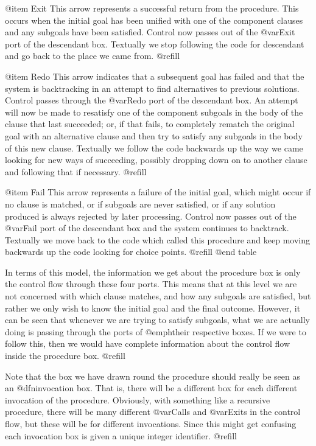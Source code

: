 @item Exit
This arrow represents a successful return from the procedure.  This
occurs when the initial goal has been unified with one of the component
clauses and any subgoals have been satisfied.  Control now passes out of
the @var{Exit} port of the descendant box.  Textually we stop following
the code for descendant and go back to the place we came from. @refill

@item Redo
This arrow indicates that a subsequent goal has failed and that the system
is backtracking in an attempt to find alternatives to previous solutions.
Control passes through the @var{Redo} port of the descendant box.  An attempt
will now be made to resatisfy one of the component subgoals in the body of
the clause that last succeeded; or, if that fails, to completely rematch
the original goal with an alternative clause and then try to satisfy any
subgoals in the body of this new clause.  Textually we follow the code
backwards up the way we came looking for new ways of succeeding, possibly
dropping down on to another clause and following that if necessary. @refill

@item Fail
This arrow represents a failure of the initial goal, which might occur
if no clause is matched, or if subgoals are never satisfied, or if any
solution produced is always rejected by later processing.  Control now
passes out of the @var{Fail} port of the descendant box and the system
continues to backtrack.  Textually we move back to the code which called
this procedure and keep moving backwards up the code looking for choice
points. @refill
@end table

In terms of this model, the information we get about the procedure box
is only the control flow through these four ports.  This means that at
this level we are not concerned with which clause matches, and how any
subgoals are satisfied, but rather we only wish to know the initial goal
and the final outcome.  However, it can be seen that whenever we are
trying to satisfy subgoals, what we are actually doing is passing
through the ports of @emph{their} respective boxes.  If we were to
follow this, then we would have complete information about the control
flow inside the procedure box. @refill

Note that the box we have drawn round the procedure should really be
seen as an @dfn{invocation box}.  That is, there will be a different box
for each different invocation of the procedure.  Obviously, with
something like a recursive procedure, there will be many different
@var{Calls} and @var{Exits} in the control flow, but these will be for
different invocations.  Since this might get confusing each invocation
box is given a unique integer identifier. @refill


